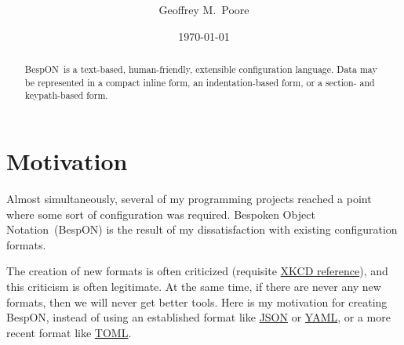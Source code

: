 \documentclass[11pt]{article}
\title{\textbf{\bespon} \\ \besponfull}
\author{Geoffrey M.\ Poore}
\date{\today}
\newcommand{\bespon}{BespON}
\newcommand{\besponfull}{Bespoken Object Notation}
\begin{document}
\maketitle


\begin{abstract}
\bespon\ is a text-based, human-friendly, extensible configuration language.  Data may be represented in a compact inline form, an indentation-based form, or a section- and keypath-based form.
\end{abstract}


\pagebreak
\tableofcontents
\pagebreak


\section{Motivation}

Almost simultaneously, several of my programming projects reached a point where some sort of configuration was required.  \besponfull\ (\bespon) is the result of my dissatisfaction with existing configuration formats.

The creation of new formats is often criticized (requisite \href{https://xkcd.com/927/}{XKCD reference}), and this criticism is often legitimate.  At the same time, if there are never any new formats, then we will never get better tools.  Here is my motivation for creating \bespon, instead of using an established format like \href{http://www.json.org/}{JSON} or \href{http://yaml.org/}{YAML}, or a more recent format like \href{https://github.com/toml-lang/toml}{TOML}.
\end{document}
